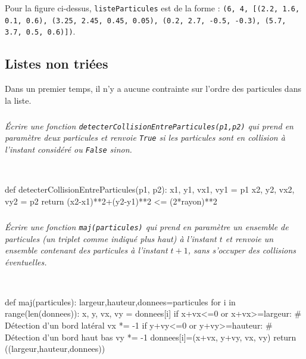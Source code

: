 \documentclass[10pt,fleqn]{article} %
\begin{document}
\begin{exemple} Pour la figure ci-dessus, \texttt{listeParticules} est de la forme :
\texttt{(6, 4, [(2.2, 1.6, 0.1, 0.6), (3.25, 2.45, 0.45, 0.05), (0.2, 2.7, -0.5, -0.3),
(5.7, 3.7, 0.5, 0.6)])}.
\end{exemple}
\fi 

\subsection*{Listes non triées}

\ifprof
\else
Dans un premier temps, il n'y a aucune contrainte sur l'ordre des particules dans la liste. 
\fi 

\subparagraph{}
\textit{Écrire une fonction \texttt{detecterCollisionEntreParticules(p1,p2)} qui prend en paramètre deux particules et renvoie \texttt{True} si les particules sont en collision à l'instant considéré ou \texttt{False} sinon.}
\ifprof
\begin{corrige}~\\
\begin{python}
def detecterCollisionEntreParticules(p1, p2): 
    x1, y1, vx1, vy1 = p1
    x2, y2, vx2, vy2 = p2
    return (x2-x1)**2+(y2-y1)**2 <= (2*rayon)**2
\end{python}
\end{corrige}
\else
\fi


\subparagraph{}
\textit{Écrire une fonction \texttt{maj(particules)} qui prend en paramètre un ensemble de particules (un triplet comme indiqué plus haut) à l'instant $t$ et renvoie un ensemble contenant des particules à l'instant $t+1$, sans s'occuper des collisions éventuelles.}
\ifprof
\begin{corrige}~\\
\begin{python}
def maj(particules):
    largeur,hauteur,donnees=particules
    for i in range(len(donnees)):
        x, y, vx, vy = donnees[i]
        if x+vx<=0 or x+vx>=largeur: # Détection d'un bord latéral
            vx *= -1
        if y+vy<=0 or y+vy>=hauteur:  # Détection d'un bord haut bas 
            vy *= -1
        donnees[i]=(x+vx, y+vy, vx, vy)
    return ((largeur,hauteur,donnees))
\end{python}
\end{corrige}
\else
\fi
\end{document}
